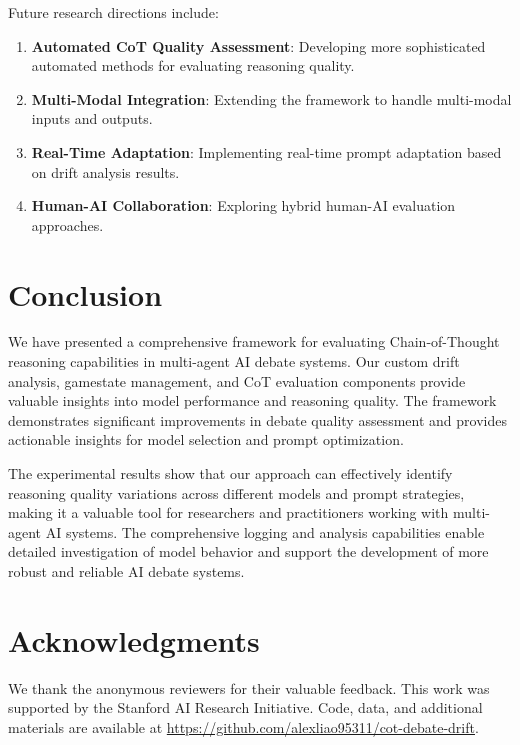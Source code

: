\documentclass[11pt]{article}
\begin{document}
Future research directions include:

\begin{enumerate}
    \item \textbf{Automated CoT Quality Assessment}: Developing more sophisticated automated methods for evaluating reasoning quality.
    \item \textbf{Multi-Modal Integration}: Extending the framework to handle multi-modal inputs and outputs.
    \item \textbf{Real-Time Adaptation}: Implementing real-time prompt adaptation based on drift analysis results.
    \item \textbf{Human-AI Collaboration}: Exploring hybrid human-AI evaluation approaches.
\end{enumerate}

\section{Conclusion}

We have presented a comprehensive framework for evaluating Chain-of-Thought reasoning capabilities in multi-agent AI debate systems. Our custom drift analysis, gamestate management, and CoT evaluation components provide valuable insights into model performance and reasoning quality. The framework demonstrates significant improvements in debate quality assessment and provides actionable insights for model selection and prompt optimization.

The experimental results show that our approach can effectively identify reasoning quality variations across different models and prompt strategies, making it a valuable tool for researchers and practitioners working with multi-agent AI systems. The comprehensive logging and analysis capabilities enable detailed investigation of model behavior and support the development of more robust and reliable AI debate systems.


\section*{Acknowledgments}

We thank the anonymous reviewers for their valuable feedback. This work was supported by the Stanford AI Research Initiative. Code, data, and additional materials are available at \url{https://github.com/alexliao95311/cot-debate-drift}.
\end{document}
